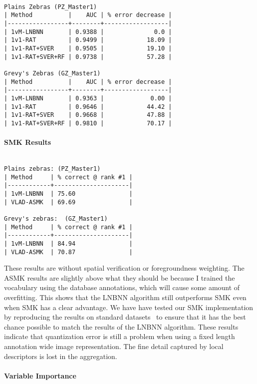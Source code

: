 \begin{verbatim}

Plains Zebras (PZ_Master1)
| Method          |    AUC | % error decrease |
|-----------------+--------+------------------|
| 1vM-LNBNN       | 0.9388 |              0.0 |
| 1v1-RAT         | 0.9499 |            18.09 |
| 1v1-RAT+SVER    | 0.9505 |            19.10 |
| 1v1-RAT+SVER+RF | 0.9738 |            57.28 |

Grevy's Zebras (GZ_Master1)
| Method          |    AUC | % error decrease |
|-----------------+--------+------------------|
| 1vM-LNBNN       | 0.9363 |             0.00 |
| 1v1-RAT         | 0.9646 |            44.42 |
| 1v1-RAT+SVER    | 0.9668 |            47.88 |
| 1v1-RAT+SVER+RF | 0.9810 |            70.17 |

\end{verbatim}


\paragraph{SMK Results}

\begin{verbatim}

Plains zebras: (PZ_Master1)
| Method     | % correct @ rank #1 |
|------------+---------------------|
| 1vM-LNBNN  | 75.60               |
| VLAD-ASMK  | 69.69               |

Grevy's zebras:  (GZ_Master1)
| Method     | % correct @ rank #1 |
|------------+---------------------|
| 1vM-LNBNN  | 84.94               |
| VLAD-ASMK  | 70.87               |

\end{verbatim}

These results are without spatial verification or foregroundness weighting.
The ASMK results are slightly above what they should be because I trained the
  vocabulary using the database annotations, which will cause some amount of
  overfitting.
This shows that the LNBNN algorithm still outperforms SMK even when SMK has a
  clear advantage.
We have have tested our SMK implementation by reproducing the results on
  standard datasets~\cite{tolias_2012} to ensure that it has the best chance
  possible to match the results of the LNBNN algorithm.
These results indicate that quantization error is still a problem when using 
a fixed length annotation wide image representation.
The fine detail captured by local descriptors is lost in the aggregation.


\paragraph{Variable Importance}

